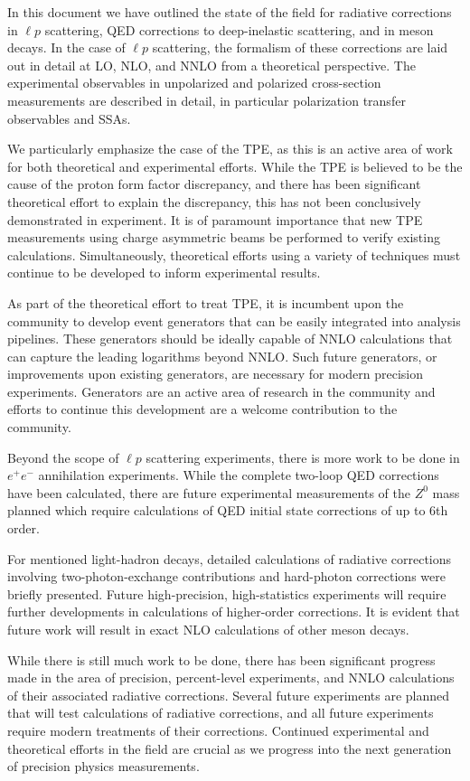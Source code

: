 \documentclass[pdflatex,sn-mathphys,Numbered,iicol]{sn-jnl}
\begin{document}
In this document we have outlined the state of the field for radiative corrections in $\ell p$ scattering, QED corrections to deep-inelastic scattering, and in meson decays. In the case of $\ell p$ scattering, the formalism of these corrections are laid out in detail at LO, NLO, and NNLO from a theoretical perspective. The experimental observables in unpolarized and polarized cross-section measurements are described in detail, in particular polarization transfer observables and SSAs. 

We particularly emphasize the case of the TPE, as this is an active area of work for both theoretical and experimental efforts. While the TPE is believed to be the cause of the proton form factor discrepancy, and there has been significant theoretical effort to explain the discrepancy, this has not been conclusively demonstrated in experiment. It is of paramount importance that new TPE measurements using charge asymmetric beams be performed to verify existing calculations. Simultaneously, theoretical efforts using a variety of techniques must continue to be developed to inform experimental results.

As part of the theoretical effort to treat TPE, it is incumbent upon the community to develop event generators that can be easily integrated into analysis pipelines. These generators should be ideally capable of NNLO calculations that can capture the leading logarithms beyond NNLO. Such future generators, or improvements upon existing generators, are necessary for modern precision experiments. Generators are an active area of research in the community and efforts to continue this development are a welcome contribution to the community.

Beyond the scope of $\ell p$ scattering experiments, there is more work to be done in $e^+e^-$ annihilation experiments. While the complete two-loop QED corrections have been calculated, there are future experimental measurements of the $Z^0$ mass planned which require calculations of QED initial state corrections of up to 6th order.

For mentioned light-hadron decays, detailed calculations of radiative corrections involving two-photon-exchange contributions and hard-photon corrections were briefly presented. Future high-precision, high-statistics experiments will require further developments in calculations of higher-order corrections. It is evident that future work will result in exact NLO calculations of other meson decays.

While there is still much work to be done, there has been significant progress made in the area of precision, percent-level experiments, and NNLO calculations of their associated radiative corrections. Several future experiments are planned that will test calculations of radiative corrections, and all future experiments require modern treatments of their corrections. Continued experimental and theoretical efforts in the field are crucial as we progress into the next generation of precision physics measurements.
\end{document}
